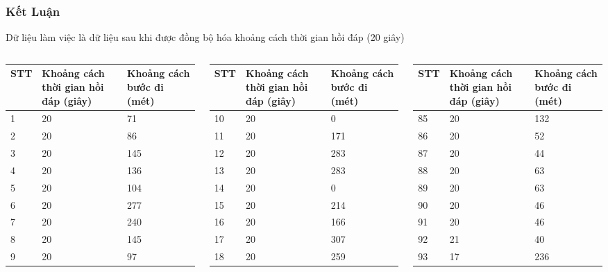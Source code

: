 \documentclass[t]{beamer}
\begin{document}

\begin{frame}
\frametitle{Kết Luận}
Dữ liệu làm việc là dữ liệu sau khi được đồng bộ hóa khoảng cách thời gian hồi đáp (20 giây)\\
\begin{columns}[T] %
\begin{column}{.3\textwidth}
\begin{tabular}{ |l|p{1cm}|p{1cm}| }
\hline
STT&Khoảng cách thời gian hồi đáp (giây) & Khoảng cách bước đi (mét)\\
\hline
\hline
1&20&71\\
\hline
2&20& 86\\
\hline
3&20& 145\\
\hline
4&20& 136\\
\hline
5&20& 104\\
\hline
6&20& 277\\
\hline
7&20& 240\\
\hline
8&20& 145\\
\hline
9&20& 97\\
\hline
\end{tabular}
\end{column}%
\hfill%
\begin{column}{.3\textwidth}
\begin{tabular}{ |l|p{1cm}|p{1cm}| }
\hline
STT&Khoảng cách thời gian hồi đáp (giây) & Khoảng cách bước đi (mét)\\
\hline
\hline
10&20& 0\\
\hline
11&20& 171\\
\hline
12&20& 283\\
\hline
13&20& 283\\
\hline
14&20& 0\\
\hline
15&20& 214\\
\hline
16&20& 166\\
\hline
17&20& 307\\
\hline
18&20& 259\\
\hline
\end{tabular}
\end{column}%
\hfill%
\begin{column}{.3\textwidth}
\begin{tabular}{ |l|p{1cm}|p{1cm}| }
\hline
STT&Khoảng cách thời gian hồi đáp (giây) & Khoảng cách bước đi (mét)\\
\hline
\hline
85&20& 132\\
\hline
86&20& 52\\
\hline
87&20& 44\\
\hline
88&20& 63\\
\hline
89&20& 63\\
\hline
90&20& 46\\
\hline
91&20& 46\\
\hline
92&21& 40\\
\hline
93&17& 236\\
\hline
\end{tabular}
\end{column}%
\end{columns}
\end{frame}
\end{document}
